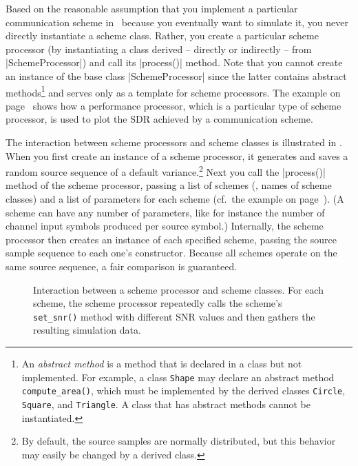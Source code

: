 Based on the reasonable assumption that you implement a particular
communication scheme in \jscsim\ because you eventually want to simulate it, you never directly instantiate a scheme class. Rather, you create a
particular scheme processor (by instantiating a class derived -- directly or
indirectly -- from |SchemeProcessor|) and call its |process()| method. Note that
you cannot create an instance of the base class |SchemeProcessor| since the
latter contains abstract methods\footnote{An \emph{abstract method} is a
method that is declared in a class but not implemented. For example, a class
\texttt{Shape} may declare an abstract method \texttt{compute\_area()}, which
must be implemented by the derived classes \texttt{Circle}, \texttt{Square}, and
\texttt{Triangle}. A class that has abstract methods cannot be instantiated.}
and serves only as a template for scheme processors. The
example on page~\pageref{sec:perfanalysis} shows how a performance processor,
which is a particular type of scheme processor, is used to plot the
SDR achieved by a communication scheme.

The interaction between scheme processors and scheme classes is illustrated in
.  When you first create an instance of a scheme
processor, it generates and saves a random source sequence of a default
variance.\footnote{By default, the source samples are normally distributed, but
this behavior may easily be changed by a derived class.} Next you call the
|process()| method of the scheme processor, passing a list of schemes (\ie,
names of scheme classes) and a list of parameters for each scheme (cf.~the
example on page~\pageref{sec:perfanalysis}). (A scheme can have any number of
parameters, like for instance the number of channel input symbols produced per
source symbol.) Internally, the scheme processor then creates an instance of
each specified scheme, passing the source sample sequence to each one's
constructor. Because all schemes operate on the same source sequence, a fair
comparison is guaranteed. 

\begin{figure}
  \begin{center}
    
  \end{center}
  \caption{Interaction between a scheme processor and scheme classes. For each
  scheme, the scheme processor repeatedly calls the scheme's \texttt{set\_snr()}
  method with different SNR values and then gathers the resulting simulation
  data.}
  \label{fig:schemeprocinteraction}
\end{figure}

